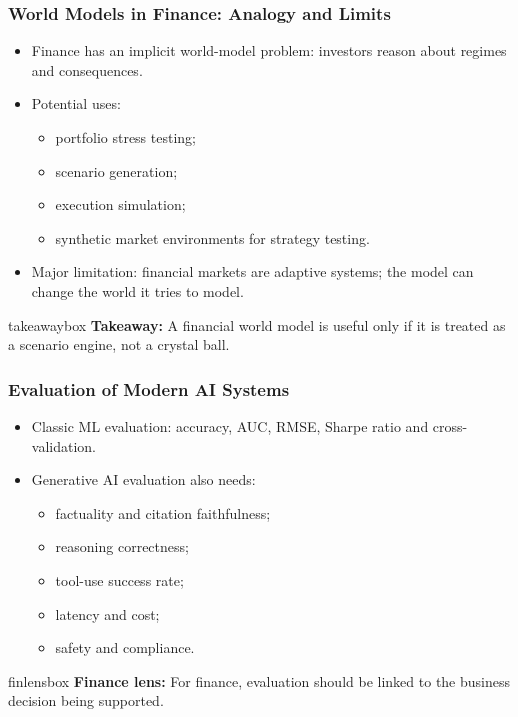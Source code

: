 \documentclass[aspectratio=169,12pt]{beamer}
\newcommand{\currentframetitle}{}
\newcommand{\slideTitle}[1]{\gdef\currentframetitle{#1}\frametitle{#1}}
\newcommand{\finlens}[1]{%
  \vspace{0.08cm}
  \begin{beamercolorbox}[wd=\linewidth,rounded=true,sep=0.18cm]{finlensbox}
    \small\textbf{Finance lens:} #1
  \end{beamercolorbox}%
}
\newcommand{\takeaway}[1]{%
  \vspace{0.08cm}
  \begin{beamercolorbox}[wd=\linewidth,rounded=true,sep=0.18cm]{takeawaybox}
    \small\textbf{Takeaway:} #1
  \end{beamercolorbox}%
}
\begin{document}
\begin{frame}
\slideTitle{World Models in Finance: Analogy and Limits}
\begin{itemize}
  \item Finance has an implicit world-model problem: investors reason about regimes and consequences.
  \item Potential uses:
  \begin{itemize}
    \item portfolio stress testing;
    \item scenario generation;
    \item execution simulation;
    \item synthetic market environments for strategy testing.
  \end{itemize}
  \item Major limitation: financial markets are adaptive systems; the model can change the world it tries to model.
\end{itemize}
\takeaway{A financial world model is useful only if it is treated as a scenario engine, not a crystal ball.}
\end{frame}


\begin{frame}
\slideTitle{Evaluation of Modern AI Systems}
\begin{itemize}
  \item Classic ML evaluation: accuracy, AUC, RMSE, Sharpe ratio and cross-validation.
  \item Generative AI evaluation also needs:
  \begin{itemize}
    \item factuality and citation faithfulness;
    \item reasoning correctness;
    \item tool-use success rate;
    \item latency and cost;
    \item safety and compliance.
  \end{itemize}
\end{itemize}
\finlens{For finance, evaluation should be linked to the business decision being supported.}
\end{frame}
\end{document}
